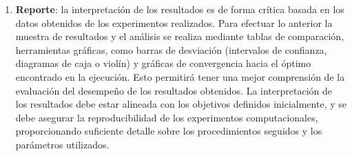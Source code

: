 \begin{enumerate}
\begin{itemize}
\begin{itemize}
            \begin{subequations} \label{eq:wmw}
                \begin{equation}
                    U = \sum_{i=1}^{m} R(Y_i)
                \end{equation}
                \begin{equation}
                    T = \sum_{i=1}^{n} R(X_i)
                \end{equation}
                \begin{equation}
                    U + T = \frac{N(N+1)}{2}
                \end{equation}
            \end{subequations}

            donde $m$ y $n$ son los tamaños de la primera y segunda muestra respectivamente, y $R(Y_i)$ junto a $R(X_i)$ son las funciones de rangos de dichas muestras. Una vez obtenidos los valores $U$ y $T$, se comprueba que se cumpla la Ec. \ref{eq:wmw}.

        \end{itemize}


    \end{itemize}


    \item \textbf{Reporte}: la interpretación de los resultados es de forma crítica basada en los datos obtenidos de los experimentos realizados. Para efectuar lo anterior la muestra de resultados y el análisis se realiza mediante tablas de comparación, herramientas gráficas, como barras de desviación (intervalos de confianza, diagramas de caja o violín) y gráficas de convergencia hacia el óptimo encontrado en la ejecución. Esto permitirá tener una mejor comprensión de la evaluación del desempeño de los resultados obtenidos. La interpretación de los resultados debe estar alineada con los objetivos definidos inicialmente, y se debe asegurar la reproducibilidad de los experimentos computacionales, proporcionando suficiente detalle sobre los procedimientos seguidos y los parámetros utilizados.

\end{enumerate}
